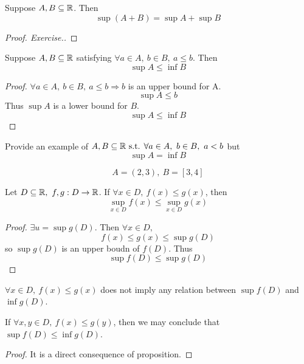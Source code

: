 \documentclass[a4paper,12pt]{article}
\begin{document}
\begin{proposition}
    Suppose \(A,B\subseteq\mathbb{R}\). Then
    \[\sup(A+B)=\sup A+\sup B\]
    \begin{proof}[Proof. Exercise.]
        
    \end{proof}
\end{proposition}

\begin{proposition}
    Suppose \(A,B\subseteq\mathbb{R}\) satisfying \(\forall a\in A,\ b\in B,\ a\le b\). Then 
    \[\sup A\le \inf B\]
    \begin{proof}
        \(\forall a\in A,\ b\in B,\ a\le b\Rightarrow b\) is an upper bound for A.
        \[\sup A\le b\]
        Thus \(\sup A\) is a lower bound for \(B\).
        \[\sup A\le\inf B\] 
    \end{proof}
\end{proposition}

\begin{exercise}
    Provide an example of \(A,B\subseteq\mathbb{R}\text{ s.t. } \forall a\in A,\ b\in B,\ a<b\) but 
    \[\sup A=\inf B\]
    \begin{example}
        \[A=(2,3),\ B=[3,4]\]
    \end{example}
\end{exercise}

\newpage

\begin{proposition}
    Let \(D\subseteq\R,\ f,g:D\rightarrow\R\). If \(\forall x\in D,\ f(x)\le g(x)\), then 
    \[\sup_{x\in D}f(x)\le \sup_{x\in D}g(x)\]
    \begin{proof}
        \(\exists u=\sup g(D)\). Then \(\forall x\in D,\)
        \[f(x)\le g(x)\le\sup g(D)\]
        so \(\sup g(D)\) is an upper boudn of \(f(D)\). Thus 
        \[\sup f(D)\le \sup g(D)\]
    \end{proof}
\end{proposition}

\begin{remark}
    \(\forall x\in D,\ f(x)\le g(x)\) does not imply any relation between \(\sup f(D)\) and \(\inf g(D)\).\\
\end{remark}
\begin{proposition}
    If \(\forall x,y\in D,\ f(x)\le g(y)\), then we may conclude that \(\sup f(D)\le \inf g(D)\).
    \begin{proof}
        It is a direct consequence of proposition.
    \end{proof}
\end{proposition}
\end{document}
